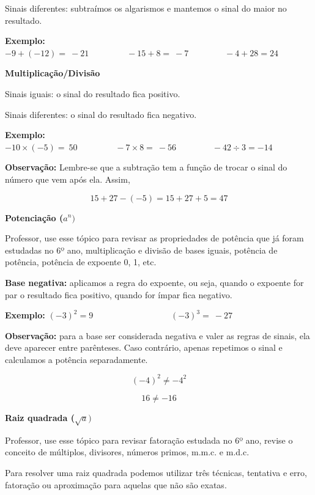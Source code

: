 Sinais diferentes: subtraímos os algarismos e mantemos o sinal do maior
no resultado.

\textbf{Exemplo:}
\(- 9 + \left( - 12 \right) = \  - 21\ \ \ \ \ \ \ \ \ \ \ \ \ \ \ \ \ \ \ \  - 15 + 8 = \  - 7\ \ \ \ \ \ \ \ \ \ \ \ \ \ \ \ \ \ \  - 4 + 28 = 24\)

\textbf{Multiplicação/Divisão}

Sinais iguais: o sinal do resultado fica positivo.

Sinais diferentes: o sinal do resultado fica negativo.

\textbf{Exemplo:}
\(- 10 \times \left( - 5 \right) = \ 50\ \ \ \ \ \ \ \ \ \ \ \ \ \ \ \ \ \ \ \  - 7 \times 8 = \  - 56\ \ \ \ \ \ \ \ \ \ \ \ \ \ \ \ \ \ \  - 42 \div 3 = - 14\)

\textbf{Observação:} Lembre-se que a subtração tem a função de trocar o
sinal do número que vem após ela. Assim,

\[15 + 27 - \left( - 5 \right) = 15 + 27 + 5 = 47\]

\textbf{Potenciação (}\(a^{n})\)

Professor, use esse tópico para revisar as propriedades de potência que
já foram estudadas no 6º ano, multiplicação e divisão de bases iguais,
potência de potência, potência de expoente 0, 1, etc.

\textbf{Base negativa:} aplicamos a regra do expoente, ou seja, quando o
expoente for par o resultado fica positivo, quando for ímpar fica
negativo.

\textbf{\hfill\break
Exemplo:}
\(\left( - 3 \right)^{2} = 9\ \ \ \ \ \ \ \ \ \ \ \ \ \ \ \ \ \ \ \ \ \ \ \ \ \ \ \ \ \ \ \ \ \ \ \ \ \ \ \ \ \left( - 3 \right)^{3} = \  - 27\ \ \ \ \ \ \ \)

\textbf{Observação:} para a base ser considerada negativa e valer as
regras de sinais, ela deve aparecer entre parênteses. Caso contrário,
apenas repetimos o sinal e calculamos a potência separadamente.

\[\left( - 4 \right)^{2} \neq - 4^{2}\]

\[16 \neq - 16\]

\textbf{Raiz quadrada (}\(\sqrt{a})\)

Professor, use esse tópico para revisar fatoração estudada no 6º ano,
revise o conceito de múltiplos, divisores, números primos, m.m.c. e
m.d.c.

Para resolver uma raiz quadrada podemos utilizar três técnicas,
tentativa e erro, fatoração ou aproximação para aquelas que não são
exatas.

